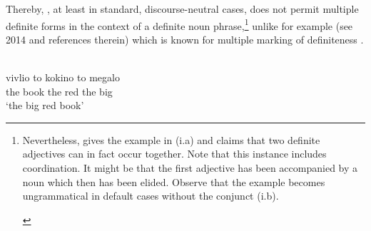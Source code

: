 \documentclass[output=paper,
modfonts
]{langscibook}
\begin{document}
Thereby, , at least in standard, discourse-neutral cases, does not permit multiple definite forms in the context of a definite noun phrase,\footnote{Nevertheless, \citet{Stolz2008} gives the example in (i.a) and claims that two definite adjectives can in fact occur together. Note that this instance includes coordination. It might be that the first adjective has been accompanied by a noun which then has been elided. Observe that the example becomes ungrammatical in default cases without the conjunct (i.b).
	
\begin{exe}
 
\begin{xlist}

\end{xlist} 
\end{exe}} unlike for example  (see \citeauthor{Alexiadou2014} 2014 and references therein) which is known for \largerpage multiple marking of definiteness .

\begin{exe}
\ex \label{ex:sereikaite:10}
 \\
 {vivlio} {to} {kokino} {to} {megalo}\\
the book the red the big\\
\trans `the big red book' \citep[19]{Alexiadou2014}
\end{exe}
\end{document}
